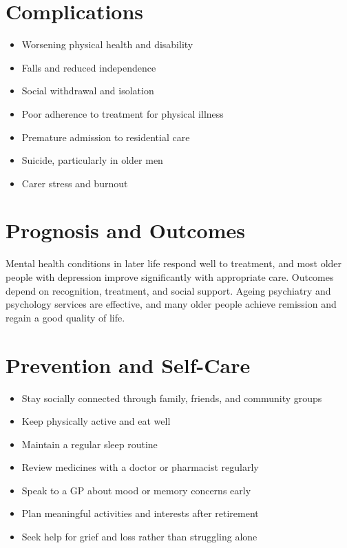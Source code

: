 \section*{Complications}
\begin{itemize}
    \item Worsening physical health and disability
    \item Falls and reduced independence
    \item Social withdrawal and isolation
    \item Poor adherence to treatment for physical illness
    \item Premature admission to residential care
    \item Suicide, particularly in older men
    \item Carer stress and burnout
\end{itemize}

\section*{Prognosis and Outcomes}
Mental health conditions in later life respond well to treatment, and most older people with depression improve significantly with appropriate care. Outcomes depend on recognition, treatment, and social support. Ageing psychiatry and psychology services are effective, and many older people achieve remission and regain a good quality of life.

\section*{Prevention and Self-Care}
\begin{itemize}
    \item Stay socially connected through family, friends, and community groups
    \item Keep physically active and eat well
    \item Maintain a regular sleep routine
    \item Review medicines with a doctor or pharmacist regularly
    \item Speak to a GP about mood or memory concerns early
    \item Plan meaningful activities and interests after retirement
    \item Seek help for grief and loss rather than struggling alone
\end{itemize}

